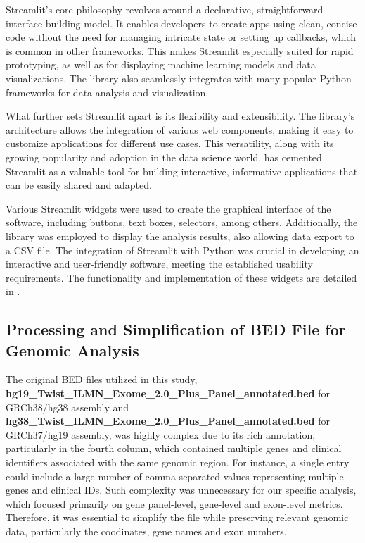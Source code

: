 Streamlit's core philosophy revolves around a declarative, straightforward interface-building model. It enables developers to create apps using clean, concise code without the need for managing intricate state or setting up callbacks, which is common in other frameworks. This makes Streamlit especially suited for rapid prototyping, as well as for displaying machine learning models and data visualizations. The library also seamlessly integrates with many popular Python frameworks for data analysis and visualization. \cite{Sehm2022}

What further sets Streamlit apart is its flexibility and extensibility. The library's architecture allows the integration of various web components, making it easy to customize applications for different use cases. This versatility, along with its growing popularity and adoption in the data science world, has cemented Streamlit as a valuable tool for building interactive, informative applications that can be easily shared and adapted. \cite{Dayanithi2023}

Various Streamlit widgets were used to create the graphical interface of the software, including buttons, text boxes, selectors, among others. Additionally, the library was employed to display the analysis results, also allowing data export to a CSV file. The integration of Streamlit with Python was crucial in developing an interactive and user-friendly software, meeting the established usability requirements. The functionality and implementation of these widgets are detailed in \cite{streamlit_doc}.

\subsection{Processing and Simplification of BED File for Genomic Analysis}

The original BED files utilized in this study, \textbf{hg19\_Twist\_ILMN\_Exome\_2.0\_Plus\_Panel\_annotated.bed} for GRCh38/hg38 assembly and \textbf{hg38\_Twist\_ILMN\_Exome\_2.0\_Plus\_Panel\_annotated.bed} for GRCh37/hg19 assembly, was highly complex due to its rich annotation, particularly in the fourth column, which contained multiple genes and clinical identifiers associated with the same genomic region. For instance, a single entry could include a large number of comma-separated values representing multiple genes and clinical IDs. Such complexity was unnecessary for our specific analysis, which focused primarily on gene panel-level, gene-level and exon-level metrics. Therefore, it was essential to simplify the file while preserving relevant genomic data, particularly the coodinates, gene names and exon numbers.

